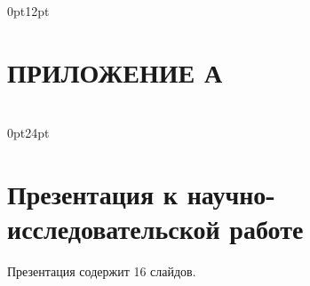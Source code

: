 \titlespacing\section{\parindent}{0pt}{12pt}
\section*{\hfill{\centering\normalsize ПРИЛОЖЕНИЕ А}\hfill}

\titlespacing\section{\parindent}{0pt}{24pt}
\section*{\hfill{\centering Презентация к научно-исследовательской работе}\hfill}

Презентация содержит 16 слайдов.